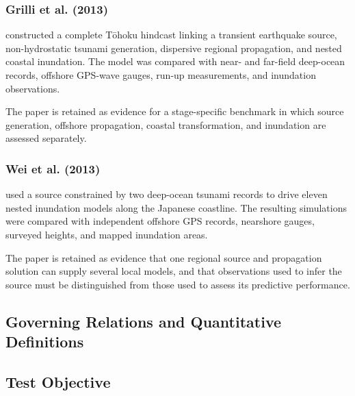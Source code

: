 \subsubsection{Grilli et al. (2013)}
\label{sec:res-ver-bmk-evidence-grilli-2013}

\textcite{grilli2013tohoku} constructed a complete Tōhoku hindcast
linking a transient earthquake source, non-hydrostatic tsunami
generation, dispersive regional propagation, and nested coastal
inundation. The model was compared with near- and far-field
deep-ocean records, offshore GPS-wave gauges, run-up measurements, and
inundation observations.

The paper is retained as evidence for a stage-specific benchmark in
which source generation, offshore propagation, coastal transformation,
and inundation are assessed separately.

\subsubsection{Wei et al. (2013)}
\label{sec:res-ver-bmk-evidence-wei-2013}

\textcite{wei2013japan} used a source constrained by two deep-ocean
tsunami records to drive eleven nested inundation models along the
Japanese coastline. The resulting simulations were compared with
independent offshore GPS records, nearshore gauges, surveyed heights,
and mapped inundation areas.

The paper is retained as evidence that one regional source and
propagation solution can supply several local models, and that
observations used to infer the source must be distinguished from those
used to assess its predictive performance.

\subsection{Governing Relations and Quantitative Definitions}
\label{sec:res-ver-bmk-governing-relations}

%

\subsection{Test Objective}
\label{sec:res-ver-bmk-test-objective}

